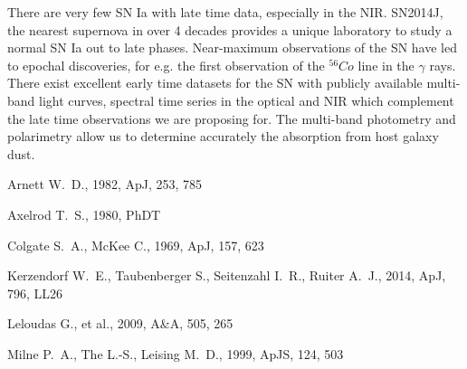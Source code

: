 \documentclass[11pt]{article}
\begin{document}
{%

There are very few  SN Ia with late time data, especially in the NIR. SN2014J, the nearest supernova in over 4 decades provides a unique laboratory to study a normal SN Ia out to late phases. Near-maximum observations of the SN have led to epochal discoveries, for e.g. the first observation of the $^{56}Co$ line in the $\gamma$ rays. There exist excellent early time datasets for the SN with publicly available multi-band light curves, spectral time series in the optical and NIR which complement the late time observations we are proposing for. The multi-band photometry and polarimetry allow us to determine accurately the absorption from host galaxy dust. 


\newpage


\begin{thebibliography}{99}
 Arnett 
W.~D., 1982, ApJ, 253, 785

  Axelrod T.~S., 1980, PhDT 

 Colgate S.~A., McKee C., 1969, ApJ, 157, 623 

 Kerzendorf W.~E., Taubenberger S., 
Seitenzahl I.~R., Ruiter A.~J., 2014, ApJ, 796, LL26


 Leloudas G., et al., 2009, A\&A, 505, 265 

 Milne P.~A., The L.-S., Leising M.~D., 1999, ApJS, 124, 503 


\end{thebibliography}}
\end{document}
